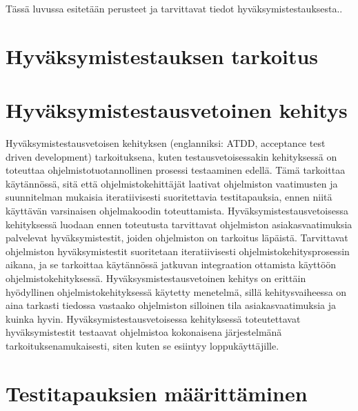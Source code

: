 Tässä luvussa esitetään perusteet ja tarvittavat tiedot hyväksymistestauksesta..

\section{Hyväksymistestauksen tarkoitus}




\section{Hyväksymistestausvetoinen kehitys}

Hyväksymistestausvetoisen kehityksen (englanniksi: ATDD, acceptance test driven development) tarkoituksena, kuten testausvetoisessakin kehityksessä on toteuttaa ohjelmistotuotannollinen prosessi testaaminen edellä.
Tämä tarkoittaa käytännössä, sitä että ohjelmistokehittäjät laativat ohjelmiston vaatimusten ja suunnitelman mukaisia iteratiivisesti suoritettavia testitapauksia, ennen niitä käyttävän varsinaisen ohjelmakoodin toteuttamista.
Hyväksymistestausvetoisessa kehityksessä luodaan ennen toteutusta tarvittavat ohjelmiston asiakasvaatimuksia palvelevat hyväksymistestit, joiden ohjelmiston on tarkoitus läpäistä.
Tarvittavat ohjelmiston hyväksymistestit suoritetaan iteratiivisesti ohjelmistokehitysprosessin aikana, ja se tarkoittaa käytännössä jatkuvan integraation ottamista käyttöön ohjelmistokehityksessä.
Hyväksysmistestausvetoinen kehitys on erittäin hyödyllinen ohjelmistokehityksessä käytetty menetelmä, sillä kehitysvaiheessa on aina tarkasti tiedossa vastaako ohjelmiston silloinen tila asiakasvaatimuksia ja kuinka hyvin.
Hyväksymistestausvetoisessa kehityksessä toteutettavat hyväksymistestit testaavat ohjelmistoa kokonaisena järjestelmänä tarkoituksenamukaisesti, siten kuten se esiintyy loppukäyttäjille.

\section{Testitapauksien määrittäminen}

